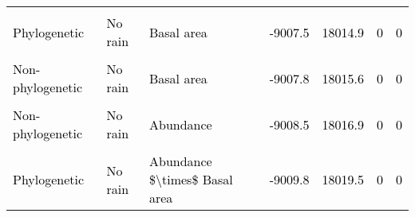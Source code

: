 \documentclass[
  12pt,
  letterpaper,
  DIV=11,
  numbers=noendperiod]{scrartcl}
\begin{document}
\begin{table}[H]
{\begin{tabular}[t]{lllllll}
\cellcolor{gray!6}{\textcolor{black}{Non-phylogenetic}} & \cellcolor{gray!6}{\textcolor{black}{Rain without interactions}} & \cellcolor{gray!6}{\textcolor{black}{Abundance + Basal area}} & \cellcolor{gray!6}{\textcolor{black}{-9007.2}} & \cellcolor{gray!6}{\textcolor{black}{18014.4}} & \cellcolor{gray!6}{\textcolor{black}{0}} & \cellcolor{gray!6}{\textcolor{black}{0}}\\
\addlinespace
\textcolor{black}{Phylogenetic} & \textcolor{black}{No rain} & \textcolor{black}{Basal area} & \textcolor{black}{-9007.5} & \textcolor{black}{18014.9} & \textcolor{black}{0} & \textcolor{black}{0}\\
\cellcolor{gray!6}{\textcolor{black}{Phylogenetic}} & \cellcolor{gray!6}{\textcolor{black}{Rain without interactions}} & \cellcolor{gray!6}{\textcolor{black}{Abundance + Basal area}} & \cellcolor{gray!6}{\textcolor{black}{-9007.5}} & \cellcolor{gray!6}{\textcolor{black}{18014.9}} & \cellcolor{gray!6}{\textcolor{black}{0}} & \cellcolor{gray!6}{\textcolor{black}{0}}\\
\textcolor{black}{Non-phylogenetic} & \textcolor{black}{No rain} & \textcolor{black}{Basal area} & \textcolor{black}{-9007.8} & \textcolor{black}{18015.6} & \textcolor{black}{0} & \textcolor{black}{0}\\
\cellcolor{gray!6}{\textcolor{black}{Phylogenetic}} & \cellcolor{gray!6}{\textcolor{black}{No rain}} & \cellcolor{gray!6}{\textcolor{black}{Abundance}} & \cellcolor{gray!6}{\textcolor{black}{-9007.9}} & \cellcolor{gray!6}{\textcolor{black}{18015.8}} & \cellcolor{gray!6}{\textcolor{black}{0}} & \cellcolor{gray!6}{\textcolor{black}{0}}\\
\textcolor{black}{Non-phylogenetic} & \textcolor{black}{No rain} & \textcolor{black}{Abundance} & \textcolor{black}{-9008.5} & \textcolor{black}{18016.9} & \textcolor{black}{0} & \textcolor{black}{0}\\
\addlinespace
\cellcolor{gray!6}{\textcolor{black}{Non-phylogenetic}} & \cellcolor{gray!6}{\textcolor{black}{No rain}} & \cellcolor{gray!6}{\textcolor{black}{Abundance + Basal area}} & \cellcolor{gray!6}{\textcolor{black}{-9009.0}} & \cellcolor{gray!6}{\textcolor{black}{18017.9}} & \cellcolor{gray!6}{\textcolor{black}{0}} & \cellcolor{gray!6}{\textcolor{black}{0}}\\
\textcolor{black}{Phylogenetic} & \textcolor{black}{No rain} & \textcolor{black}{Abundance \$\textbackslash{}times\$ Basal area} & \textcolor{black}{-9009.8} & \textcolor{black}{18019.5} & \textcolor{black}{0} & \textcolor{black}{0}\\

\end{tabular}}
\end{table}
\end{document}
